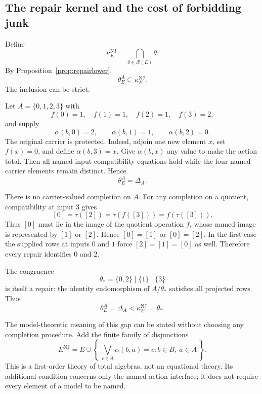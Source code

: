 \subsection{The repair kernel and the cost of forbidding junk}

Define
\begin{equation}\label{eq:repairkernel}
\kappa_E^{\mathrm{NJ}}=
\bigcap_{\theta\in\mathcal R(E)}\theta.
\end{equation}
By Proposition~\ref{prop:repairlower},
\[
\theta_E^A\subseteq\kappa_E^{\mathrm{NJ}}.
\]
The inclusion can be strict.

\begin{example}\label{ex:strictgap}
Let $A=\{0,1,2,3\}$ with
\[
f(0)=1,
\quad f(1)=1,
\quad f(2)=1,
\quad f(3)=2,
\]
and supply
\[
\alpha(b,0)=2,
\qquad
\alpha(b,1)=1,
\qquad
\alpha(b,2)=0.
\]
The original carrier is protected.  Indeed, adjoin one new element $x$, set $f(x)=0$, and define $\alpha(b,3)=x$. Give $\alpha(b,x)$ any value
to make the action total. Then all named-input compatibility equations hold while the four named carrier elements remain distinct.  Hence
\[
\theta_E^A=\Delta_A.
\]

There is no carrier-valued completion on $A$.  For any completion on a quotient, compatibility at input $3$ gives
\[
[0]=\tau([2])=\tau(f([3]))=f(\tau([3])).
\]
Thus $[0]$ must lie in the image of the quotient operation $f$, whose named image is represented by $[1]$ or $[2]$.  Hence $[0]=[1]$ or $[0]=[2]$.  In the first case the supplied rows at inputs $0$ and $1$ force $[2]=[1]=[0]$ as well.  Therefore every repair identifies $0$ and $2$.

The congruence
\[
\theta_*=\{0,2\}\mid\{1\}\mid\{3\}
\]
is itself a repair: the identity endomorphism of $A/\theta_*$ satisfies all projected rows.  Thus
\[
\boxed{
\theta_E^A=\Delta_A
<
\kappa_E^{\mathrm{NJ}}=\theta_*.
}
\]
\end{example}


The model-theoretic meaning of this gap can be stated without choosing any
completion procedure. Add the finite family of disjunctions
\begin{equation}\label{eq:nojunk}
E^{\mathrm{NJ}}=E\cup
\left\{\ \bigvee_{c\in A}\alpha(b,a)=c:
 b\in B,\ a\in A\ \right\}.
\end{equation}
This is a first-order theory of total algebras, not an equational theory.
Its additional condition concerns only the named action interface; it does
not require every element of a model to be named.


